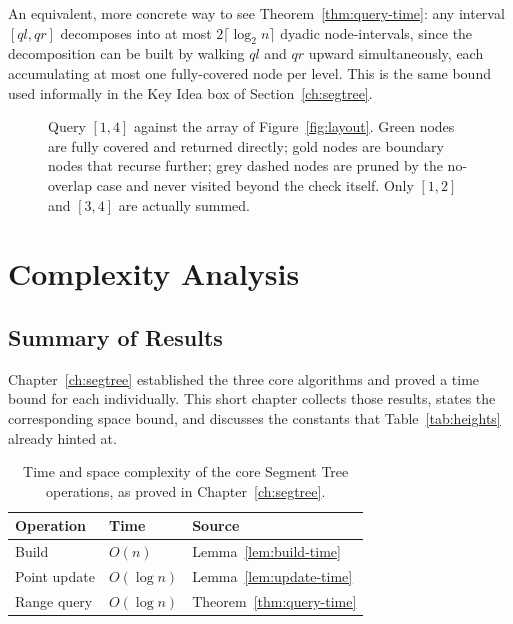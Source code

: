 \documentclass[
  11pt,
  a4paper,
  twoside=false,
  numbers=noenddot,
  headings=big,
  parskip=half,
  toc=bibliography,
  toc=listof,
  bibliography=totoc
]{scrreprt}
\newcounter{example}[chapter]
\newcommand{\Oh}[1]{O\!\left(#1\right)}
\newcommand{\tblhead}[1]{\textbf{\sffamily #1}}
\begin{document}
\begin{remark}
An equivalent, more concrete way to see Theorem~\ref{thm:query-time}: any interval $[ql,qr]$ decomposes into at most $2\lceil \log_2 n\rceil$ dyadic node-intervals, since the decomposition can be built by walking $ql$ and $qr$ upward simultaneously, each accumulating at most one fully-covered node per level. This is the same bound used informally in the Key Idea box of Section~\ref{ch:segtree}.
\end{remark}

\begin{figure}[H]
\centering
{}
\caption{Query $[1,4]$ against the array of Figure~\ref{fig:layout}. Green nodes are fully covered and returned directly; gold nodes are boundary nodes that recurse further; grey dashed nodes are pruned by the no-overlap case and never visited beyond the check itself. Only $[1,2]$ and $[3,4]$ are actually summed.}
\label{fig:query-example}
\end{figure}

\chapter{Complexity Analysis}
\label{ch:complexity}

\section{Summary of Results}
Chapter~\ref{ch:segtree} established the three core algorithms and proved a time bound for each individually. This short chapter collects those results, states the corresponding space bound, and discusses the constants that Table~\ref{tab:heights} already hinted at.

\begin{table}[h]
\centering
\caption{Time and space complexity of the core Segment Tree operations, as proved in Chapter~\ref{ch:segtree}.}
\label{tab:complexity-ch4}
\begin{tabular}{llp{6.3cm}}
\toprule
\tblhead{Operation} & \tblhead{Time} & \tblhead{Source} \\
\midrule
Build          & $\Oh{n}$        & Lemma~\ref{lem:build-time} \\
Point update   & $\Oh{\log n}$   & Lemma~\ref{lem:update-time} \\
Range query    & $\Oh{\log n}$   & Theorem~\ref{thm:query-time} \\
\bottomrule
\end{tabular}
\end{table}
\end{document}
